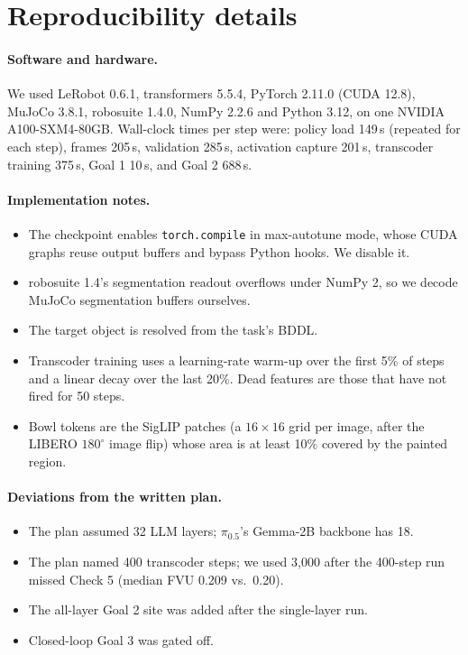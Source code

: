 \documentclass{article} %
\newcommand{\pifive}{$\pi_{0.5}$}
\begin{document}



\appendix
\section{Reproducibility details}
\label{app:repro}
\paragraph{Software and hardware.} We used LeRobot 0.6.1, transformers 5.5.4, PyTorch 2.11.0 (CUDA 12.8), MuJoCo 3.8.1, robosuite 1.4.0, NumPy 2.2.6 and Python 3.12, on one NVIDIA A100-SXM4-80GB. Wall-clock times per step were: policy load 149\,s (repeated for each step), frames 205\,s, validation 285\,s, activation capture 201\,s, transcoder training 375\,s, Goal 1 10\,s, and Goal 2 688\,s.

\paragraph{Implementation notes.}
\begin{itemize}[leftmargin=*,itemsep=0pt,topsep=1pt]
  \item The checkpoint enables \texttt{torch.compile} in max-autotune mode, whose CUDA graphs reuse output buffers and bypass Python hooks. We disable it.
  \item robosuite 1.4's segmentation readout overflows under NumPy 2, so we decode MuJoCo segmentation buffers ourselves.
  \item The target object is resolved from the task's BDDL.
  \item Transcoder training uses a learning-rate warm-up over the first 5\% of steps and a linear decay over the last 20\%. Dead features are those that have not fired for 50 steps.
  \item Bowl tokens are the SigLIP patches (a $16\times16$ grid per image, after the LIBERO $180^\circ$ image flip) whose area is at least 10\% covered by the painted region.
\end{itemize}

\paragraph{Deviations from the written plan.}
\begin{itemize}[leftmargin=*,itemsep=0pt,topsep=1pt]
  \item The plan assumed 32 LLM layers; \pifive{}'s Gemma-2B backbone has 18.
  \item The plan named 400 transcoder steps; we used 3,000 after the 400-step run missed Check 5 (median FVU 0.209 vs.\ 0.20).
  \item The all-layer Goal 2 site was added after the single-layer run.
  \item Closed-loop Goal 3 was gated off.
\end{itemize}
\end{document}
